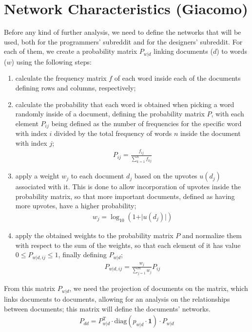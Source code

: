 \documentclass[conference]{IEEEtran}
\begin{document}
\section{Network Characteristics (Giacomo)}

Before any kind of further analysis, we need to define the networks that will be used, both for the programmers' subreddit and for the designers' subreddit. For each of them, we create a probability matrix $P_{w|d}$ linking documents ($d$) to words ($w$) using the following steps:
\begin{enumerate}
    \item calculate the frequency matrix $f$ of each word inside each of the documents defining rows and columns, respectively;
    \item calculate the probability that each word is obtained when picking a word randomly inside of a document, defining the probability matrix $P$, with each element $P_{ij}$ being defined as the number of frequencies for the specific word with index $i$ divided by the total frequency of words $n$ inside the document with index $j$;
    \begin{align*}
        P_{ij} = \frac{f_{ij}}{\sum_{k=1}^n f_{kj}}
    \end{align*}
    \item apply a weight $w_j$ to each document $d_j$ based on the upvotes $u(d_j)$ associated with it. This is done to allow incorporation of upvotes inside the probability matrix, so that more important documents, defined as having more upvotes, have a higher probability; 
    \begin{align}
        w_j = \log_{10}(1 + \vert u(d_j) \vert)
        \label{eq:documentWeight}
    \end{align}
    \item apply the obtained weights to the probability matrix $P$ and normalize them with respect to the sum of the weights, so that each element of it has value $0 \le P_{w \vert d, ij} \le 1$, finally defining $P_{w \vert d}$;
    \begin{align*}
        P_{w \vert d, ij} = \frac{w_j}{\sum_{j=1}^m w_j}P_{ij}
    \end{align*}
\end{enumerate}

From this matrix $P_{w|d}$, we need the projection of documents on the matrix, which links documents to documents, allowing for an analysis on the relationships between documents; this matrix will define the documents' networks.
\begin{align*}
    P_{dd} = P_{w \vert d}^\text{T} \cdot \text{diag}(p_{w\vert d} \cdot \mathbf{1}) \cdot P_{w \vert d}
\end{align*}
\end{document}
